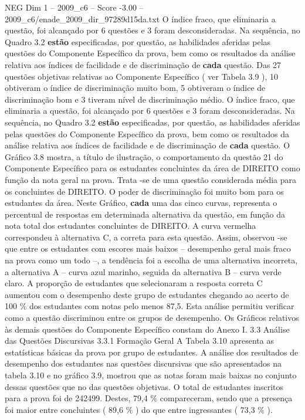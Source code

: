 \begin{textsample}{NEG Dim 1 – 2009\_c6 – Score -3.00 – 2009\_c6/enade\_2009\_dir\_97289d15da.txt}
O índice fraco, que eliminaria a questão, foi alcançado por 6 questões e 3 foram desconsideradas.
Na sequência, no Quadro 3.2 \textbf{estão} especificadas, por questão, as habilidades aferidas pelas questões do Componente Específico da prova, bem como os resultados da análise relativa aos índices de facilidade e de discriminação de \textbf{cada} questão.
Das 27 questões objetivas relativas ao Componente Específico ( ver Tabela 3.9 ), 10 obtiveram o índice de discriminação muito bom, 5 obtiveram o índice de discriminação bom e 3 tiveram nível de discriminação médio.
O índice fraco, que eliminaria a questão, foi alcançado por 6 questões e 3 foram desconsideradas.
Na sequência, no Quadro 3.2 \textbf{estão} especificadas, por questão, as habilidades aferidas pelas questões do Componente Específico da prova, bem como os resultados da análise relativa aos índices de facilidade e de discriminação de \textbf{cada} questão.
O Gráfico 3.8 mostra, a título de ilustração, o comportamento da questão 21 do Componente Específico para os estudantes concluintes da área de DIREITO como função da nota geral na prova.
Trata -se de uma questão considerada média para os concluintes de DIREITO.
O poder de discriminação foi muito bom para os estudantes da área.
Neste Gráfico, \textbf{cada} uma das cinco curvas, representa o percentual de respostas em determinada alternativa da questão, em função da nota total dos estudantes concluintes de DIREITO.
A curva vermelha correspondeu à alternativa C, a correta para esta questão.
Assim, observou -se que entre os estudantes com escores mais baixos – desempenho geral mais fraco na prova como um todo –, a tendência foi a escolha de uma alternativa incorreta, a alternativa A – curva azul marinho, seguida da alternativa B – curva verde claro.
A proporção de estudantes que selecionaram a resposta correta C aumentou com o desempenho deste grupo de estudantes chegando ao acerto de 100 \% dos estudantes com notas pelo menos 87,5.
Esta análise permitiu verificar como a questão discriminou entre os grupos de desempenho.
Os Gráficos relativos às demais questões do Componente Específico constam do Anexo I. 3.3 Análise das Questões Discursivas 3.3.1 Formação Geral A Tabela 3.10 apresenta as estatísticas básicas da prova por grupo de estudantes.
A análise dos resultados de desempenho dos estudantes nas questões discursivas que são apresentados na tabela 3.10 e no gráfico 3.9, mostrou que as notas foram mais baixas no conjunto dessas questões que no das questões objetivas.
O total de estudantes inscritos para a prova foi de 242499.
Destes, 79,4 \% compareceram, sendo que a presença foi maior entre concluintes ( 89,6 \% ) do que entre ingressantes ( 73,3 \% ).

\end{textsample}
